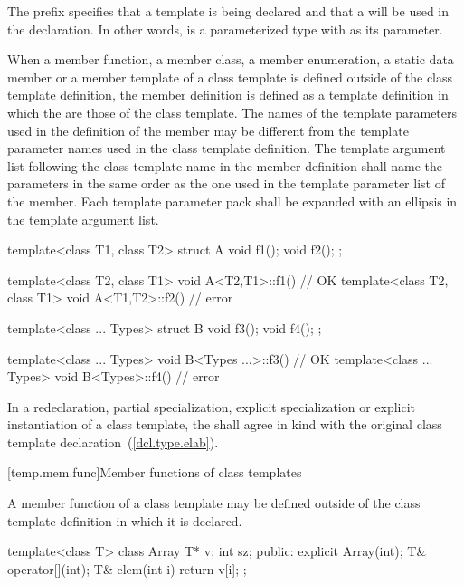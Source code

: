 \pnum
The prefix
specifies that a template is being declared and that a
will be used in the declaration.
In other words,
is a parameterized type with
as its parameter.
\exitexample

\pnum
When a member function, a member class, a member enumeration, a static data member or
a member template of a class
template is defined outside of the class template definition,
the member definition is defined as a template definition in which the
are those of the class template.
The names of the template parameters used in the definition of the member may
be different from the template parameter names used in the class
template definition.
The template argument list following the class template name in the member
definition shall name the parameters in the same order as the one used in
the template parameter list of the member. Each template
parameter pack shall be expanded with an ellipsis in the template
argument list.
\enterexample

\begin{codeblock}
template<class T1, class T2> struct A {
  void f1();
  void f2();
};

template<class T2, class T1> void A<T2,T1>::f1() { }    // OK
template<class T2, class T1> void A<T1,T2>::f2() { }    // error
\end{codeblock}

\begin{codeblock}
template<class ... Types> struct B {
  void f3();
  void f4();
};

template<class ... Types> void B<Types ...>::f3() { }    // OK
template<class ... Types> void B<Types>::f4() { }        // error
\end{codeblock}

\exitexample

\pnum
In a redeclaration, partial
specialization,
explicit specialization or explicit
instantiation of a class template, the
shall agree in kind with the original class template declaration~(\ref{dcl.type.elab}).

[temp.mem.func]{Member functions of class templates}

\pnum
{}%
A member function
of a class template
may be defined outside of the class
template definition in which it is declared.
\enterexample

\begin{codeblock}
template<class T> class Array {
  T* v;
  int sz;
public:
  explicit Array(int);
  T& operator[](int);
  T& elem(int i) { return v[i]; }
};
\end{codeblock}

